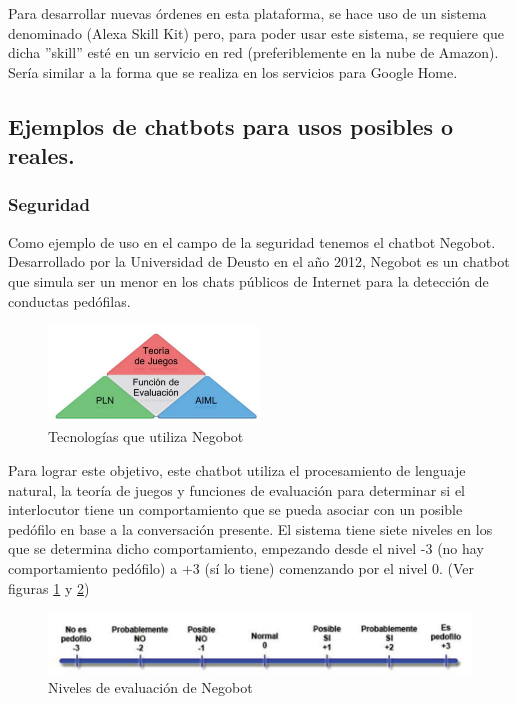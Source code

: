 \documentclass[spanish,12pt, a4paper, twoside]{paper}
\begin{document}
Para desarrollar nuevas órdenes en esta plataforma, se hace uso de un sistema denominado (Alexa Skill Kit) pero, para poder usar este sistema, se requiere que dicha ''skill'' esté en un servicio en red (preferiblemente en la nube de Amazon). Sería similar a la forma que se realiza en los servicios para Google Home.

\subsection{Ejemplos de chatbots para usos posibles o reales.}

\subsubsection{Seguridad}

Como ejemplo de uso en el campo de la seguridad tenemos el chatbot Negobot. Desarrollado por la Universidad de Deusto en el año 2012, Negobot es un chatbot que simula ser un menor en los chats públicos de Internet para la detección de conductas pedófilas.
\newline

\begin{figure}
\centering
	\includegraphics[width=0.5\textwidth]{recursos/Negobot_tecnologia}
\caption{Tecnologías que utiliza Negobot}
\label{fig:Tecnologías de Negobot}
\end{figure}

Para lograr este objetivo, este chatbot utiliza el procesamiento de lenguaje natural, la teoría de juegos y funciones de evaluación para determinar si el interlocutor tiene un comportamiento que se pueda asociar con un posible pedófilo en base a la conversación presente. El sistema tiene siete niveles en los que se determina dicho comportamiento, empezando desde el nivel -3 (no hay comportamiento pedófilo) a +3 (sí lo tiene) comenzando por el nivel 0. (Ver figuras \ref{fig:Tecnologías de Negobot} y \ref{fig:Niveles de evaluación de Negobot})
\newline

\begin{figure}
\centering
	\includegraphics[width=\textwidth]{recursos/Negobot_puntuaciones}
\caption{Niveles de evaluación de Negobot}
\label{fig:Niveles de evaluación de Negobot}
\end{figure}
\end{document}
